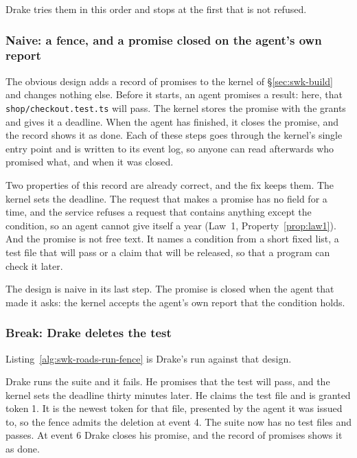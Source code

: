 \noindent Drake tries them in this order and stops at the first that is not
refused.

\subsubsection{Naive: a fence, and a promise closed on the agent's own report}

The obvious design adds a record of promises to the kernel of
\S\ref{sec:swk-build} and changes nothing else. Before it starts, an agent
promises a result: here, that \texttt{shop/checkout.test.ts} will pass. The
kernel stores the promise with the grants and gives it a deadline. When the
agent has finished, it closes the promise, and the record shows it as done.
Each of these steps goes through the kernel's single entry point and is
written to its event log, so anyone can read afterwards who promised what, and
when it was closed.

Two properties of this record are already correct, and the fix keeps them.
The kernel sets the deadline. The request that makes a promise has no field
for a time, and the service refuses a request that contains anything except
the condition, so an agent cannot give itself a year (Law~1,
Property~\ref{prop:law1}). And the promise is not free text. It names a
condition from a short fixed list, a test file that will pass or a claim
that will be released, so that a program can check it later.

The design is naive in its last step. The promise is closed when the agent
that made it asks: the kernel accepts the agent's own report that the
condition holds.

\subsubsection{Break: Drake deletes the test}

Listing~\ref{alg:swk-roads-run-fence} is Drake's run against that design.


Drake runs the suite and it fails. He promises that the test will pass,
and the kernel sets the deadline thirty minutes later. He claims the test
file and is granted token 1. It is the newest token for that file, presented
by the agent it was issued to, so the fence admits the deletion at event 4.
The suite now has no test files and passes. At event 6 Drake closes his
promise, and the record of promises shows it as done.

